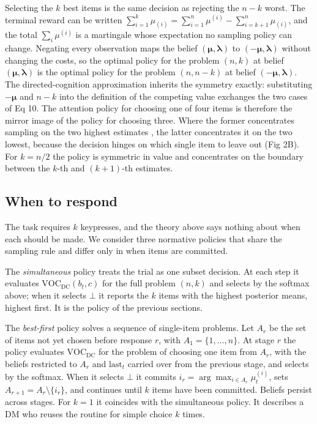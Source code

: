 \documentclass[10pt,letterpaper]{article}
\begin{document}
Selecting the \(k\) best items is the same decision as rejecting the
\(n - k\) worst. The terminal reward can be written
\(\sum_{i=1}^{k} \mu_{(i)} = \sum_{i=1}^{n} \mu^{(i)} - \sum_{i=k+1}^{n} \mu_{(i)}\),
and the total \(\sum_i \mu^{(i)}\) is a martingale whose expectation no
sampling policy can change. Negating every observation maps the belief
\((\boldsymbol{\mu}, \boldsymbol{\lambda})\) to
\((-\boldsymbol{\mu}, \boldsymbol{\lambda})\) without changing the
costs, so the optimal policy for the problem \((n, k)\) at belief
\((\boldsymbol{\mu}, \boldsymbol{\lambda})\) is the optimal policy for
the problem \((n, n-k)\) at belief
\((-\boldsymbol{\mu}, \boldsymbol{\lambda})\). The directed-cognition
approximation inherits the symmetry exactly: substituting
\(-\boldsymbol{\mu}\) and \(n - k\) into the definition of the competing
value exchanges the two cases of Eq 10. The attention policy for
choosing one of four items is therefore the mirror image of the policy
for choosing three. Where the former concentrates sampling on the two
highest estimates \cite{callaway2021}, the latter concentrates it on the
two lowest, because the decision hinges on which single item to leave
out (Fig 2B). For \(k = n/2\) the policy is symmetric in value and
concentrates on the boundary between the \(k\)-th and \((k+1)\)-th
estimates.

\subsection*{When to respond}\label{when-to-respond}

The task requires \(k\) keypresses, and the theory above says nothing
about when each should be made. We consider three normative policies
that share the sampling rule and differ only in when items are
committed.

The \emph{simultaneous} policy treats the trial as one subset decision.
At each step it evaluates \(\text{VOC}_{\text{DC}}(b_t, c)\) for the
full problem \((n, k)\) and selects by the softmax above; when it
selects \(\bot\) it reports the \(k\) items with the highest posterior
means, highest first. It is the policy of the previous sections.

The \emph{best-first} policy solves a sequence of single-item problems.
Let \(A_r\) be the set of items not yet chosen before response \(r\),
with \(A_1 = \{1, \dots, n\}\). At stage \(r\) the policy evaluates
\(\text{VOC}_{\text{DC}}\) for the problem of choosing one item from
\(A_r\), with the beliefs restricted to \(A_r\) and \(\text{last}_t\)
carried over from the previous stage, and selects by the softmax. When
it selects \(\bot\) it commits
\(i_r = \arg\max_{i \in A_r} \mu_t^{(i)}\), sets
\(A_{r+1} = A_r \setminus \{i_r\}\), and continues until \(k\) items
have been committed. Beliefs persist across stages. For \(k = 1\) it
coincides with the simultaneous policy. It describes a DM who reuses the
routine for simple choice \(k\) times.
\end{document}
